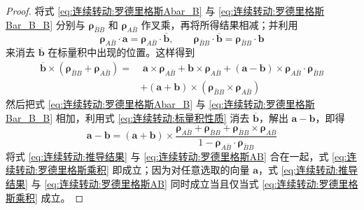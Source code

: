 \begin{proof}
将式 \eqref{eq:连续转动:罗德里格斯Abar_B} 与 \eqref{eq:连续转动:罗德里格斯Bar_B_B} 分别与 $\boldsymbol{\rho}_{\bar B B}$ 和 $\boldsymbol{\rho}_{A\bar B}$ 作叉乘，再将所得结果相减；并利用
\begin{equation}\label{eq:连续转动:标量积性质}
\boldsymbol{\rho}_{A\bar B}\cdot\mathbf{a}=\boldsymbol{\rho}_{A\bar B}\cdot\overline{\mathbf{b}},\qquad
\boldsymbol{\rho}_{\bar B B}\cdot\overline{\mathbf{b}}=\boldsymbol{\rho}_{\bar B B}\cdot\mathbf{b}
\end{equation}
来消去 $\overline{\mathbf{b}}$ 在标量积中出现的位置。这样得到
\begin{equation}
\begin{aligned}
\overline{\mathbf{b}}\times(\boldsymbol{\rho}_{\bar B B}+\boldsymbol{\rho}_{A\bar B})
=&\;\mathbf{a}\times\boldsymbol{\rho}_{A\bar B}+\mathbf{b}\times\boldsymbol{\rho}_{A\bar B}+(\mathbf{a}-\mathbf{b})\times\boldsymbol{\rho}_{A\bar B}\cdot\boldsymbol{\rho}_{\bar B B}\\
&+(\mathbf{a}+\mathbf{b})\times(\boldsymbol{\rho}_{\bar B B}\times\boldsymbol{\rho}_{A\bar B})
\end{aligned}
\end{equation}
然后把式 \eqref{eq:连续转动:罗德里格斯Abar_B} 与 \eqref{eq:连续转动:罗德里格斯Bar_B_B} 相加，利用式 \eqref{eq:连续转动:标量积性质} 消去 $\overline{\mathbf{b}}$，解出 $\mathbf{a}-\mathbf{b}$，即得
\begin{equation}\label{eq:连续转动:推导结果}
\mathbf{a}-\mathbf{b}=(\mathbf{a}+\mathbf{b})\times\frac{\boldsymbol{\rho}_{A\bar B}+\boldsymbol{\rho}_{\bar B B}+\boldsymbol{\rho}_{\bar B B}\times\boldsymbol{\rho}_{A\bar B}}{1-\boldsymbol{\rho}_{A\bar B}\cdot\boldsymbol{\rho}_{\bar B B}}
\end{equation}
将式 \eqref{eq:连续转动:推导结果} 与 \eqref{eq:连续转动:罗德里格斯AB} 合在一起，式 \eqref{eq:连续转动:罗德里格斯乘积} 即成立；因为对任意选取的向量 $\mathbf{a}$，式 \eqref{eq:连续转动:推导结果} 与 \eqref{eq:连续转动:罗德里格斯AB} 同时成立当且仅当式 \eqref{eq:连续转动:罗德里格斯乘积} 成立。


\end{proof}
